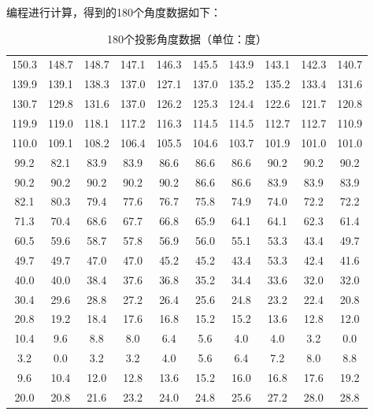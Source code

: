 编程进行计算，得到的180个角度数据如下：
\begin{table}[H]
    \centering
    \caption{180个投影角度数据（单位：度）}
    \label{tab:projection_angles} %
    \begin{tabular}{cccccccccc}
        \toprule
        150.3 & 148.7 & 148.7 & 147.1 & 146.3 & 145.5 & 143.9 & 143.1 & 142.3 & 140.7 \\
        139.9 & 139.1 & 138.3 & 137.0 & 127.1 & 137.0 & 135.2 & 135.2 & 133.4 & 131.6 \\
        130.7 & 129.8 & 131.6 & 137.0 & 126.2 & 125.3 & 124.4 & 122.6 & 121.7 & 120.8 \\
        119.9 & 119.0 & 118.1 & 117.2 & 116.3 & 114.5 & 114.5 & 112.7 & 112.7 & 110.9 \\
        110.0 & 109.1 & 108.2 & 106.4 & 105.5 & 104.6 & 103.7 & 101.9 & 101.0 & 101.0 \\
        99.2 & 82.1 & 83.9 & 83.9 & 86.6 & 86.6 & 86.6 & 90.2 & 90.2 & 90.2 \\
        90.2 & 90.2 & 90.2 & 90.2 & 90.2 & 86.6 & 86.6 & 83.9 & 83.9 & 83.9 \\
        82.1 & 80.3 & 79.4 & 77.6 & 76.7 & 75.8 & 74.9 & 74.0 & 72.2 & 72.2 \\
        71.3 & 70.4 & 68.6 & 67.7 & 66.8 & 65.9 & 64.1 & 64.1 & 62.3 & 61.4 \\
        60.5 & 59.6 & 58.7 & 57.8 & 56.9 & 56.0 & 55.1 & 53.3 & 43.4 & 49.7 \\
        49.7 & 49.7 & 47.0 & 47.0 & 45.2 & 45.2 & 43.4 & 53.3 & 42.4 & 41.6 \\
        40.0 & 40.0 & 38.4 & 37.6 & 36.8 & 35.2 & 34.4 & 33.6 & 32.0 & 32.0 \\
        30.4 & 29.6 & 28.8 & 27.2 & 26.4 & 25.6 & 24.8 & 23.2 & 22.4 & 20.8 \\
        20.8 & 19.2 & 18.4 & 17.6 & 16.8 & 15.2 & 15.2 & 13.6 & 12.8 & 12.0 \\
        10.4 & 9.6 & 8.8 & 8.0 & 6.4 & 5.6 & 4.0 & 4.0 & 3.2 & 0.0 \\
        3.2 & 0.0 & 3.2 & 3.2 & 4.0 & 5.6 & 6.4 & 7.2 & 8.0 & 8.8 \\
        9.6 & 10.4 & 12.0 & 12.8 & 13.6 & 15.2 & 16.0 & 16.8 & 17.6 & 19.2 \\
        20.0 & 20.8 & 21.6 & 23.2 & 24.0 & 24.8 & 25.6 & 27.2 & 28.0 & 28.8 \\
        \bottomrule
    \end{tabular}
\end{table}

